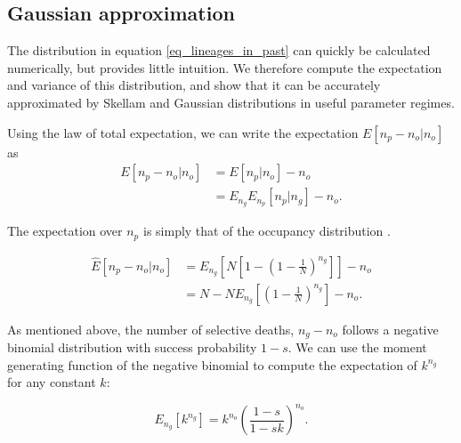 \documentclass[review]{elsarticle}
\newcommand{\sgcomment}[1]{{\color{red}{SG: #1}}}
\begin{document}
\subsection{Gaussian approximation}
\label{subsec_gaussian}

The distribution in equation \ref{eq_lineages_in_past} can quickly be calculated numerically, but
provides little intuition. We therefore compute the
expectation and variance of this distribution, and show that it can be accurately approximated by
Skellam and Gaussian distributions in useful parameter regimes.

Using the law of total expectation, we can write the expectation $E[n_p-n_o | n_o]$ as 
\begin{equation*}
  \begin{aligned}
    \label{eq_lineages_approx}
    E[n_p-n_o | n_o] &=        E[n_p | n_o]       - n_o \\
                     &=E_{n_g} E_{n_p}[n_p | n_g] - n_o.
  \end{aligned}
\end{equation*}

The expectation over $n_p$ is simply that of the occupancy distribution \cite{Wakeley2009}.

\begin{equation*}
  \begin{aligned}
    \label{eq_lineages_derive}
    \hat{E}[n_p -n_o | n_o]
    & =   E_{n_g}\left[N\left[1-\left(1 - \frac{1}{N} \right)^{n_g} \right]\right]- n_o\\
    & =   N-N  E_{n_g}\left[\left(1 - \frac{1}{N} \right)^{n_g} \right] -n_o. 
  \end{aligned}
\end{equation*}

As mentioned above, the number of selective deaths, $n_g-n_o$ follows a negative binomial
distribution with success probability $1-s$. We can use the moment generating function of the negative binomial to compute the
expectation of $k^{n_g}$ for any constant $k$:

\begin{equation}
  E_{n_g}[k^{n_g}] = k^{n_o}  \left(\frac{1-s}{1-sk}\right)^{n_o}.
  \label{eq_identity}
\end{equation} 
\end{document}
